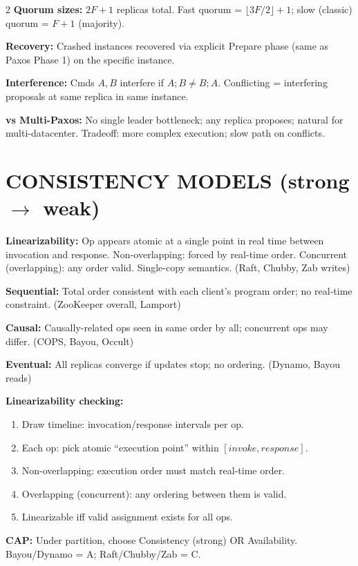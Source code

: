 \documentclass[9pt]{article}
\begin{document}
\begin{multicols*}{2}
\textbf{Quorum sizes:} $2F+1$ replicas total. Fast quorum = $\lfloor 3F/2\rfloor + 1$; slow (classic) quorum = $F+1$ (majority).

\textbf{Recovery:} Crashed instances recovered via explicit Prepare phase (same as Paxos Phase 1) on the specific instance.

\textbf{Interference:} Cmds $A,B$ interfere if $A;B \ne B;A$. Conflicting = interfering proposals at same replica in same instance.

\textbf{vs Multi-Paxos:} No single leader bottleneck; any replica proposes; natural for multi-datacenter. Tradeoff: more complex execution; slow path on conflicts.

\section*{CONSISTENCY MODELS (strong $\to$ weak)}

\textbf{Linearizability:} Op appears atomic at a single point in real time between invocation and response. Non-overlapping: forced by real-time order. Concurrent (overlapping): any order valid. Single-copy semantics. (Raft, Chubby, Zab writes)

\textbf{Sequential:} Total order consistent with each client's program order; no real-time constraint. (ZooKeeper overall, Lamport)

\textbf{Causal:} Causally-related ops seen in same order by all; concurrent ops may differ. (COPS, Bayou, Occult)

\textbf{Eventual:} All replicas converge if updates stop; no ordering. (Dynamo, Bayou reads)

\textbf{Linearizability checking:}
\begin{enumerate}
  \item Draw timeline: invocation/response intervals per op.
  \item Each op: pick atomic ``execution point'' within $[invoke, response]$.
  \item Non-overlapping: execution order must match real-time order.
  \item Overlapping (concurrent): any ordering between them is valid.
  \item Linearizable iff valid assignment exists for all ops.
\end{enumerate}

\textbf{CAP:} Under partition, choose Consistency (strong) OR Availability. Bayou/Dynamo = A; Raft/Chubby/Zab = C.


\end{multicols*}
\end{document}
